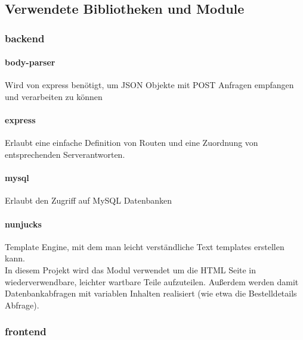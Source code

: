 \documentclass[12pt,pdftex,parskip=half]{scrartcl}
\begin{document}
    \newpage

    \subsection{Verwendete Bibliotheken und Module}

        \subsubsection{backend}

            \paragraph{body-parser}
            Wird von express benötigt, um JSON Objekte mit POST Anfragen empfangen und verarbeiten zu können

            \paragraph{express}
            Erlaubt eine einfache Definition von Routen und eine Zuordnung von entsprechenden Serverantworten.

            \paragraph{mysql}
            Erlaubt den Zugriff auf MySQL Datenbanken

            \paragraph{nunjucks}
            Template Engine, mit dem man leicht verständliche Text templates erstellen kann.\\
            In diesem Projekt wird das Modul verwendet um die HTML Seite in wiederverwendbare, leichter wartbare Teile aufzuteilen.
            Außerdem werden damit Datenbankabfragen mit variablen Inhalten realisiert (wie etwa die Bestelldetails Abfrage).

            \newpage


        \subsubsection{frontend}
\end{document}
